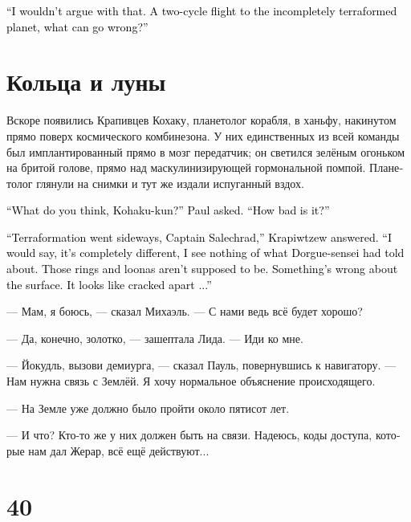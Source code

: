 \documentclass[a4paper,12pt,fleqn]{book}\usepackage{cooltooltips}\usepackage{polyglossia}\setdefaultlanguage[babelshorthands=true]{russian}\setotherlanguage{english}\defaultfontfeatures{Ligatures=TeX,Mapping=tex-text} \usepackage{xcolor}\definecolor{lightgray}{HTML}{bbbbbb}\color{lightgray}\newcommand{\ml}[3]{\textenglish{\textcolor{black}{#3}}}
\begin{document}
\ml{$0$}
{--- Даже не буду спорить.}
{``I wouldn't argue with that.}
\ml{$0$}
{Лететь с двумя циклами к недотерраформированной планете --- что может пойти не так?}
{A two-cycle flight to the incompletely terraformed planet, what can go wrong?''}

\section{Кольца и луны}

Вскоре появились Крапивцев Кохаку, планетолог корабля, в ханьфу, накинутом прямо поверх космического комбинезона.
У них единственных из всей команды был имплантированный прямо в мозг передатчик;
он светился зелёным огоньком на бритой голове, прямо над маскулинизирующей гормональной помпой. 
Планетолог глянули на снимки и тут же издали испуганный вздох.

\ml{$0$}
{--- Что скажешь, Кохаку-кун? --- спросил Пауль.}
{``What do you think, Kohaku-kun?'' Paul asked.}
\ml{$0$}
{--- Всё плохо?}
{``How bad is it?''}

\ml{$0$}
{--- Терраформирование прошло не по плану, капитан Салехрад, --- ответили Крапивцев.}
{``Terraformation went sideways, Captain Salechrad,'' Krapiwtzew answered.}
\ml{$0$}
{--- Я бы сказали, она совсем другая, я не вижу ничего из того, о чём говорил Дорге-сенсей.}
{``I would say, it's completely different, I see nothing of what Dorgue-sensei had told about.}
\ml{$0$}
{Вот этиx колец и лун быть не должно.}
{Those rings and loonas aren't supposed to be.}
\ml{$0$}
{С поверхностью что-то не так.}
{Something's wrong about the surface.}
\ml{$0$}
{Она как будто растрескалась на куски...}
{It looks like cracked apart ...''}

--- Мам, я боюсь, --- сказал Михаэль.
--- С нами ведь всё будет хорошо?

--- Да, конечно, золотко, --- зашептала Лида.
--- Иди ко мне.

--- Йокудль, вызови демиурга, --- сказал Пауль, повернувшись к навигатору.
--- Нам нужна связь с Землёй.
Я хочу нормальное объяснение происходящего.

--- На Земле уже должно было пройти около пятисот лет.

--- И что?
Кто-то же у них должен быть на связи.
Надеюсь, коды доступа, которые нам дал Жерар, всё ещё действуют...

\section{40}
\end{document}
